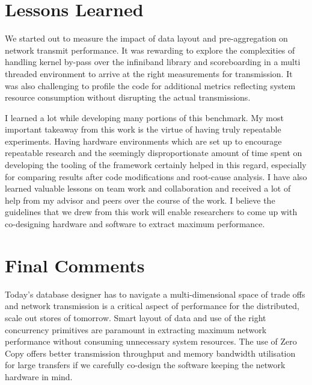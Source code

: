 \section{Lessons Learned}
We started out to measure the impact of data layout and pre-aggregation on network transmit performance. 
It was rewarding to explore the complexities of handling kernel by-pass over the infiniband library and 
scoreboarding in a multi threaded environment to arrive at the right measurements for transmission.
It was also challenging to profile the code for additional metrics reflecting system resource consumption 
without disrupting the actual transmissions. 

I learned a lot while developing many portions of this benchmark. My most important takeaway from this work 
is the virtue of having truly repeatable experiments. Having hardware environments which are set up to encourage 
repeatable research and the seemingly disproportionate amount of time spent on developing the tooling of the 
framework certainly helped in this regard, especially for comparing results after code modifications and root-cause analysis. 
I have also learned valuable lessons on team work and collaboration and received a lot of help from my 
advisor and peers over the course of the work. I believe the guidelines that we drew from this work will 
enable researchers to come up with co-designing hardware and software to extract maximum performance. 

\section{Final Comments}
Today's database designer has to navigate a multi-dimensional space of trade offs and network transmission 
is a critical aspect of performance for the distributed, scale out stores of tomorrow. Smart layout of data and  
use of the right concurrency primitives are paramount in extracting maximum network performance without consuming 
unnecessary system resources. The use of Zero Copy offers better transmission throughput and memory bandwidth utilisation for 
large transfers if we carefully co-design the software keeping the network hardware in mind.